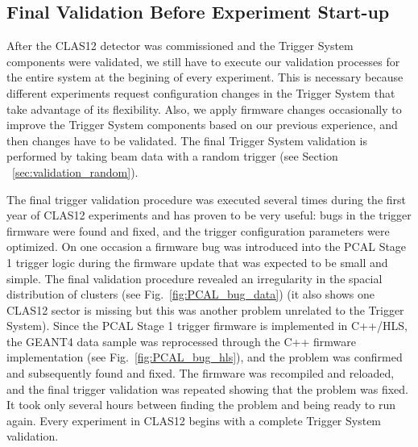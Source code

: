 








\subsection{Final Validation Before Experiment Start-up}

After the CLAS12 detector was commissioned and the Trigger System components were validated, we still have to execute our validation processes for the entire system at the begining of every experiment. This is necessary because different experiments request configuration changes in the Trigger System that take advantage of its flexibility. Also, we apply firmware changes occasionally to improve the Trigger System components based on our previous experience, and then changes have to be validated. The final Trigger System validation is performed by taking beam data with a random trigger (see Section ~\ref{sec:validation_random}).

The final trigger validation procedure was executed several times during the first year of CLAS12 experiments and has proven to be very useful: bugs in the trigger firmware were found and fixed, and the trigger configuration parameters were optimized. On one occasion a firmware bug was introduced into the PCAL Stage 1 trigger logic during the firmware update that was expected to be small and simple. The final validation procedure revealed an irregularity in the spacial distribution of clusters (see Fig.~\ref{fig:PCAL_bug_data}) (it also shows one CLAS12 sector is missing but this was another problem unrelated to the Trigger System). Since the PCAL Stage 1 trigger firmware is implemented in C++/HLS, the GEANT4 data sample was reprocessed through the C++ firmware implementation (see Fig.~\ref{fig:PCAL_bug_hls}), and the problem was confirmed and subsequently found and fixed. The firmware was recompiled and reloaded, and the final trigger validation was repeated showing that the problem was fixed. It took only several hours between finding the problem and being ready to run again. Every experiment in CLAS12 begins with a complete Trigger System validation. 

